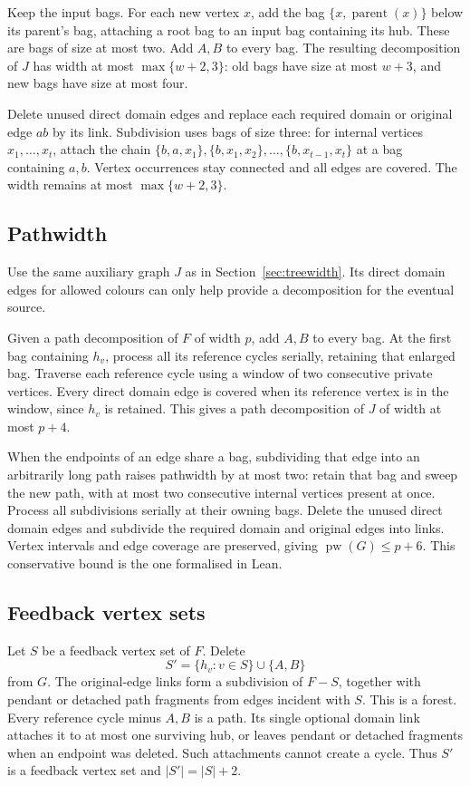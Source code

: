 \documentclass[11pt]{article}
\theoremstyle{remark}
\DeclareMathOperator{\pw}{pw}
\begin{document}
Keep the input bags. For each new vertex $x$, add the bag
$\{x,\operatorname{parent}(x)\}$ below its parent's bag, attaching a root
bag to an input bag containing its hub. These are bags of size at most
two. Add $A,B$ to every bag. The resulting decomposition of $J$ has width
at most $\max\{w+2,3\}$: old bags have size at most $w+3$, and new bags
have size at most four.

Delete unused direct domain edges and replace each required domain or
original edge $ab$ by its link. Subdivision uses bags of size three:
for internal vertices $x_1,\ldots,x_t$, attach the chain
$\{b,a,x_1\},\{b,x_1,x_2\},\ldots,\{b,x_{t-1},x_t\}$ at a bag containing
$a,b$. Vertex occurrences stay connected and all edges are covered.
The width remains at most $\max\{w+2,3\}$.

\subsection{Pathwidth}\label{sec:pathwidth}
Use the same auxiliary graph $J$ as in Section~\ref{sec:treewidth}.
Its direct domain edges for allowed colours can only help provide a
decomposition for the eventual source.

Given a path decomposition of $F$ of width $p$, add $A,B$ to every bag.
At the first bag containing $h_v$, process all its reference cycles
serially, retaining that enlarged bag. Traverse each reference cycle
using a window of two consecutive private vertices. Every direct domain
edge is covered when its reference vertex is in the window, since $h_v$
is retained. This gives a path decomposition of $J$ of width at most
$p+4$.

When the endpoints of an edge share a bag, subdividing that edge into an
arbitrarily long path raises pathwidth by at most two: retain that bag
and sweep the new path, with at most two consecutive internal vertices
present at once. Process all subdivisions serially at their owning bags.
Delete the unused direct domain edges and subdivide the required domain
and original edges into links. Vertex intervals and edge coverage are
preserved, giving $\pw(G)\leq p+6$. This conservative bound is the one
formalised in Lean.

\subsection{Feedback vertex sets}\label{sec:feedback}
Let $S$ be a feedback vertex set of $F$. Delete
\[
 S'=\{h_v:v\in S\}\cup\{A,B\}
\]
from $G$. The original-edge links form a subdivision of $F-S$, together
with pendant or detached path fragments from edges incident with $S$.
This is a forest. Every reference cycle minus $A,B$ is a path. Its single
optional domain link attaches it to at most one surviving hub, or leaves
pendant or detached fragments when an endpoint was deleted. Such
attachments cannot create a cycle. Thus $S'$ is a feedback vertex set
and $|S'|=|S|+2$.
\end{document}
